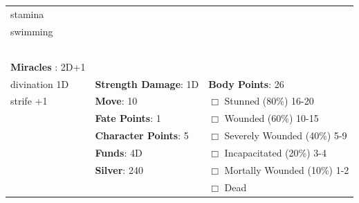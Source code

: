 \documentclass[10pt]{article}
\begin{document}
\begin{table}
\begin{tabular}{m{156pt} m{156pt} m{156pt}}
stamina              \hrulefill &  \hrulefill &  \hrulefill \\

swimming             \hrulefill &  \hrulefill &  \hrulefill \\

 \hrulefill &  \hrulefill &  \hrulefill \\

 \hrulefill &  \hrulefill &  \hrulefill \\

 \hrulefill &  \hrulefill &  \hrulefill \\

 \hrulefill &  \hrulefill &  \hrulefill \\

                                  &                                 &                             \\
\textbf{Miracles }: 2D+1 \hrulefill  &                                 &                             \\
divination        1D \hrulefill & \textbf{Strength Damage}: 1D \hrulefill                             & \textbf{Body Points}: 26 \hrulefill \\
strife            +1 \hrulefill                        & \textbf{Move}:             10             \hrulefill    & $\Box$ Stunned \footnotesize{(80\%)} \hfill 16-20 \\
 \hrulefill                        & \textbf{Fate Points}:      1      \hrulefill    & $\Box$ Wounded \footnotesize{(60\%)} \hfill 10-15 \\
 \hrulefill                        & \textbf{Character Points}: 5 \hrulefill    & $\Box$ Severely Wounded \footnotesize{(40\%)} \hfill 5-9 \\
 \hrulefill                        & \textbf{Funds}:            4D            \hrulefill    & $\Box$ Incapacitated \footnotesize{(20\%)} \hfill 3-4 \\
 \hrulefill                        & \textbf{Silver}:           240           \hrulefill    & $\Box$ Mortally Wounded \footnotesize{(10\%)} \hfill 1-2 \\
 \hrulefill                        &  \hrulefill                                                       & $\Box$ Dead   \\
\end{tabular}
\end{table}
\cleardoublepage
\end{document}
